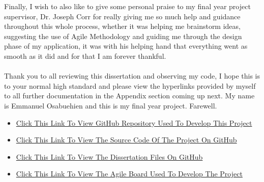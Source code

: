 Finally, I wish to also like to give some personal praise to my final year project supervisor, Dr. Joseph Corr for really giving me so much help and guidance throughout this whole process, whether it was helping me brainstorm ideas, suggesting the use of Agile Methodology and guiding me through the design phase of my application, it was with his helping hand that everything went as smooth as it did and for that I am forever thankful.\\ \\ 
Thank you to all reviewing this dissertation and observing my code, I hope this is to your normal high standard and please view the hyperlinks provided by myself to all further documentation in the Appendix section coming up next. My name is Emmanuel Osabuehien and this is my final year project. Farewell.

\begin{appendices}
\begin{itemize}
\item \href{https://github.com/Emmanuel-Osabuehien/AppliedProjectMinorDissertation}{Click This Link To View GitHub Repository Used To Develop This Project}
\item \href{https://github.com/Emmanuel-Osabuehien/AppliedProjectMinorDissertation/tree/main/meal-planning-system}{Click This Link To View The Source Code Of The Project On GitHub}
\item \href{https://github.com/Emmanuel-Osabuehien/AppliedProjectMinorDissertation/tree/main/dissertation}{Click This Link To View The Dissertation Files On GitHub}
\item \href{https://g00373559.atlassian.net/jira/software/projects/MPRO/boards/4}{Click This Link To View The Agile Board Used To Develop The Project}
\end{itemize}
\end{appendices}